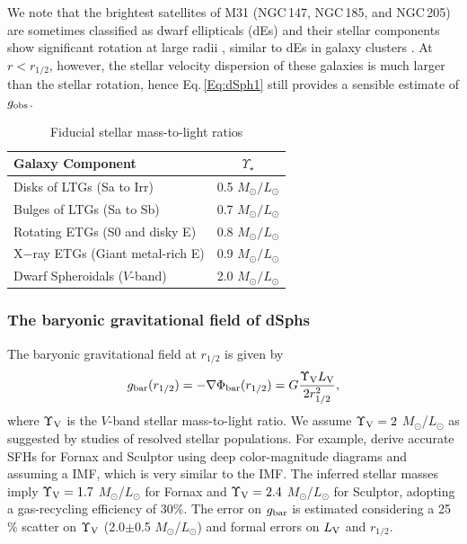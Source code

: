 \documentclass[apjl, twocolappendix]{emulateapj}
\begin{document}
We note that the brightest satellites of M31 (NGC\,147, NGC\,185, and NGC\,205) are sometimes classified as dwarf ellipticals (dEs) and their stellar components show significant rotation at large radii \citep{2010ApJ...711..361G}, similar to dEs in galaxy clusters \citep[e.g.,][]{vanZee2004}. At $r < r_{1/2}$, however, the stellar velocity dispersion of these galaxies is much larger than the stellar rotation, hence Eq.\,\ref{Eq:dSph1} still provides a sensible estimate of $g_{\rm obs}$.

\begin{table}
\begin{center}
\caption{Fiducial stellar mass-to-light ratios}
\begin{tabular}{lc}
\hline
\hline
Galaxy Component & $\Upsilon_{\star}$\\
\hline
Disks of LTGs  (Sa to Irr)    & 0.5 $M_{\odot}/L_{\odot}$\\
Bulges of LTGs (Sa to Sb)     & 0.7 $M_{\odot}/L_{\odot}$\\
Rotating ETGs (S0 and disky E)& 0.8 $M_{\odot}/L_{\odot}$\\
X$-$ray ETGs   (Giant metal-rich E)  & 0.9 $M_{\odot}/L_{\odot}$\\
Dwarf Spheroidals ($V$-band) & 2.0 $M_{\odot}/L_{\odot}$\\
\hline
\end{tabular}
\label{tab:ML}
\end{center}
\end{table}
\subsubsection{The baryonic gravitational field of dSphs}

The baryonic gravitational field at $r_{1/2}$ is given by
\begin{equation}\label{Eq:dSph2}
 g_{\rm bar}(r_{1/2}) = -\nabla\Phi_{\rm bar}(r_{1/2}) = G \dfrac{\Upsilon_{\rm V} L_{\rm V}}{2 r_{1/2}^2},
\end{equation}
where $\Upsilon_{\rm V}$ is the $V$-band stellar mass-to-light ratio. We assume $\Upsilon_{\rm V} = 2$ $M_{\odot}$/$L_{\odot}$ as suggested by studies of resolved stellar populations. For example, \citet{deBoer2012a, deBoer2012b} derive accurate SFHs for Fornax and Sculptor using deep color-magnitude diagrams and assuming a \citet{Kroupa2001} IMF, which is very similar to the \citet{Chabrier2003} IMF. The inferred stellar masses imply $\Upsilon_{\rm V} = 1.7$ $M_{\odot}$/$L_{\odot}$ for Fornax and $\Upsilon_{\rm V} = 2.4$ $M_{\odot}$/$L_{\odot}$ for Sculptor, adopting a gas-recycling efficiency of 30$\%$. The error on $g_{\rm bar}$ is estimated considering a 25$\%$ scatter on $\Upsilon_{\rm V}$ (2.0$\pm$0.5 $M_{\odot}$/$L_{\odot}$) and formal errors on $L_{\rm V}$ and $r_{1/2}$.
\end{document}
